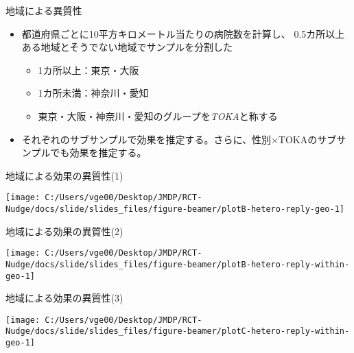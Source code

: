 \documentclass[
      aspectratio=169,
        12pt,
    ]{beamer}
\providecommand{\tightlist}{%
  \setlength{\itemsep}{0pt}\setlength{\parskip}{0pt}}
\begin{document}
\begin{frame}{地域による異質性}
\protect\hypertarget{ux5730ux57dfux306bux3088ux308bux7570ux8ceaux6027}{}
\begin{itemize}
\tightlist
\item
  都道府県ごとに10平方キロメートル当たりの病院数を計算し、
  0.5カ所以上ある地域とそうでない地域でサンプルを分割した

  \begin{itemize}
  \tightlist
  \item
    1カ所以上：東京・大阪
  \item
    1カ所未満：神奈川・愛知
  \item
    東京・大阪・神奈川・愛知のグループを\emph{TOKA}と称する
  \end{itemize}
\item
  それぞれのサブサンプルで効果を推定する。さらに、性別×TOKAのサブサンプルでも効果を推定する。
\end{itemize}
\end{frame}

\begin{frame}{地域による効果の異質性(1)}
\protect\hypertarget{ux5730ux57dfux306bux3088ux308bux52b9ux679cux306eux7570ux8ceaux60271}{}
\begin{center}\texttt{[image: C:/Users/vge00/Desktop/JMDP/RCT-Nudge/docs/slide/slides\_files/figure-beamer/plotB-hetero-reply-geo-1]} \end{center}
\end{frame}

\begin{frame}{地域による効果の異質性(2)}
\protect\hypertarget{ux5730ux57dfux306bux3088ux308bux52b9ux679cux306eux7570ux8ceaux60272}{}
\begin{center}\texttt{[image: C:/Users/vge00/Desktop/JMDP/RCT-Nudge/docs/slide/slides\_files/figure-beamer/plotB-hetero-reply-within-geo-1]} \end{center}
\end{frame}

\begin{frame}{地域による効果の異質性(3)}
\protect\hypertarget{ux5730ux57dfux306bux3088ux308bux52b9ux679cux306eux7570ux8ceaux60273}{}
\begin{center}\texttt{[image: C:/Users/vge00/Desktop/JMDP/RCT-Nudge/docs/slide/slides\_files/figure-beamer/plotC-hetero-reply-within-geo-1]} \end{center}
\end{frame}
\end{document}

